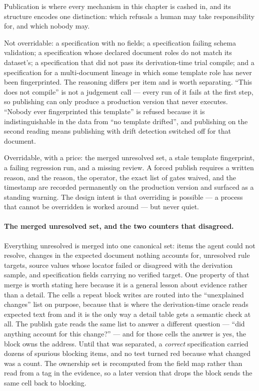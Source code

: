 Publication is where every mechanism in this chapter is cashed in, and its structure encodes one
distinction: which refusals a human may take responsibility for, and which nobody may.

Not overridable: a specification with no fields; a specification failing schema validation; a
specification whose declared document roles do not match its dataset's; a specification that did
not pass its derivation-time trial compile; and a specification for a multi-document lineage in
which some template role has never been fingerprinted. The reasoning differs per item and is
worth separating. ``This does not compile'' is not a judgement call --- every run of it fails at
the first step, so publishing can only produce a production version that never executes.
``Nobody ever fingerprinted this template'' is refused because it is indistinguishable in the
data from ``no template drifted'', and publishing on the second reading means publishing with
drift detection switched off for that document.

Overridable, with a price: the merged unresolved set, a stale template fingerprint, a failing
regression run, and a missing review. A forced publish requires a written reason, and the reason,
the operator, the exact list of gates waived, and the timestamp are recorded permanently on the
production version and surfaced as a standing warning. The design intent is that overriding is
possible --- a process that cannot be overridden is worked around --- but never quiet.

\paragraph{The merged unresolved set, and the two counters that disagreed.}
Everything unresolved is merged into one canonical set: items the agent could not resolve,
changes in the expected document nothing accounts for, unresolved rule targets, source values
whose locator failed or disagreed with the derivation sample, and specification fields carrying
no verified target. One property of that merge is worth stating here because it is a general
lesson about evidence rather than a detail. The cells a repeat block writes are routed into the
``unexplained changes'' list on purpose, because that is where the derivation-time oracle reads
expected text from and it is the only way a detail table gets a semantic check at all. The
publish gate reads the same list to answer a different question --- ``did anything account for
this change?'' --- and for those cells the answer is yes, the block owns the address. Until that
was separated, a \emph{correct} specification carried dozens of spurious blocking items, and no
test turned red because what changed was a count. The ownership set is recomputed from the field
map rather than read from a tag in the evidence, so a later version that drops the block sends
the same cell back to blocking.

